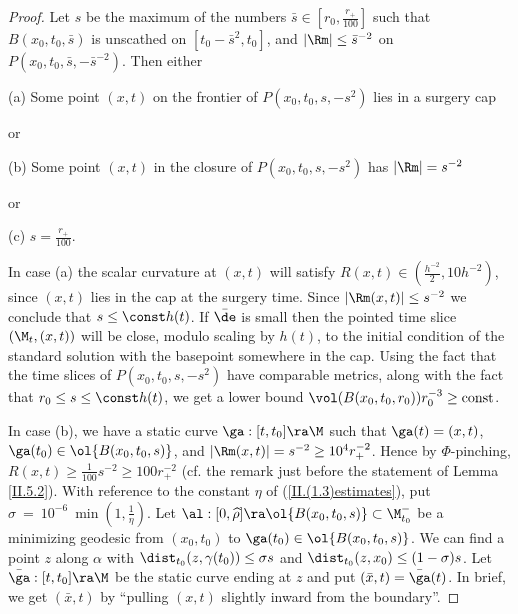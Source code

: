 \begin{proof}
Let $s$ be the maximum of the numbers $\bar s\in [r_0,\frac{r_+}{100}]$
such that $B(x_0,t_0,\bar s)$ is unscathed on $[t_0-\bar s^2,t_0]$,
and $|\Rm|\leq \bar s^{-2}$ on $P(x_0,t_0,\bar s,-\bar s^{-2})$.
Then  either

(a) Some point $(x,t)$ on the frontier of $P(x_0,t_0,s,-s^2)$
lies in a surgery cap

or

(b) Some point $(x,t)$ in the closure of $P(x_0,t_0,s,-s^2)$
has $|\Rm|=s^{-2}$


or

(c) $s=\frac{r_+}{100}$.

In case (a) the scalar curvature
at $(x,t)$ will satisfy $R(x,t)\in (\frac{h^{-2}}{2},10h^{-2})$,
since $(x,t)$ lies in the cap at the surgery time.  Since
$|\Rm(x,t)|\leq s^{-2}$ we conclude that $s \le \const h(t)$.
If $\bar\de$ is small then the pointed time slice
$(\M_t,(x,t))$ will be close, modulo scaling by $h(t)$, to
the initial condition of the standard solution with
the basepoint somewhere in the cap.  Using the
fact that the time slices of $P(x_0,t_0,s,-s^2)$ have
comparable metrics, along with the fact that
$r_0 \le s  \le \const h(t)$, we get a lower bound
$\vol(B(x_0,t_0,r_0))r_0^{-3}\geq \mbox{const}$.

In case (b), we have a static curve $\ga:[t,t_0]\ra\M$
such that $\ga(t)=(x,t)$, $\ga(t_0)\in \ol{B(x_0,t_0,s)}$,
and $|\Rm(x,t)|=s^{-2}\geq 10^4r_+^{-2}$.
Hence by $\Phi$-pinching,
$R(x,t)\geq \frac{1}{100} s^{-2} \geq 100 r_+^{-2}$
(cf. the remark just before the statement of
Lemma \ref{II.5.2}).
With reference to the constant $\eta$ of
(\ref{II.(1.3)estimates}),
put $\sigma \: = \: 10^{-6} \: \min \left( 1,
\frac{1}{\eta} \right)$.
Let
$\al:[0,\widehat{\rho}]\ra \ol{B(x_0,t_0,s)}\subset \M_{t_0}^-$
be a minimizing geodesic from $(x_0,t_0)$ to
$\ga(t_0)\in \ol{B(x_0,t_0,s)}$. We can find a point
$z$ along $\alpha$ with $\dist_{t_0}(z, \gamma(t_0)) \le \sigma s$ and
$\dist_{t_0}(z, x_0) \le (1 - \sigma) s$.
Let $\bar\ga:[t,t_0]\ra\M$
be the static curve ending at $z$
and put $(\bar x,t)= \bar\ga(t)$.  In brief,
we get $(\bar x,t)$ by ``pulling $(x,t)$ slightly
inward from the boundary''.


\end{proof}
